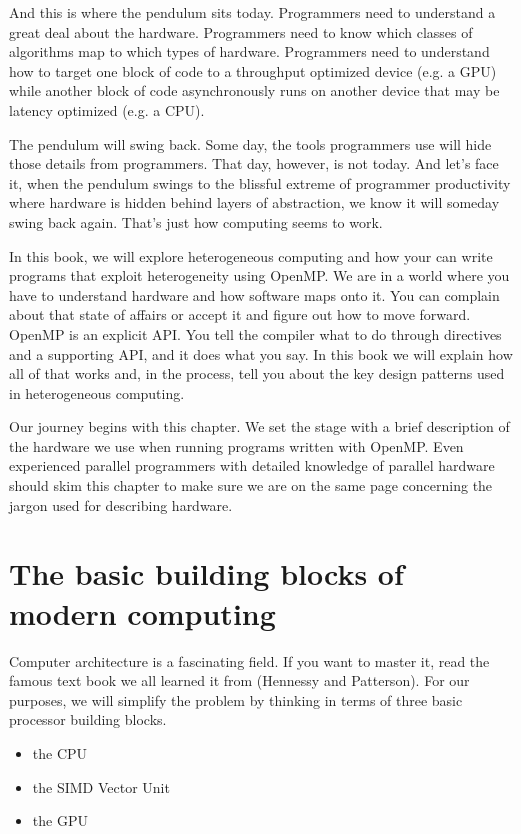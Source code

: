 And this is where the pendulum sits today.   Programmers need to understand a great deal about the hardware.  Programmers need to 
know which classes of algorithms map to which types of hardware.  Programmers need to understand how to target one block of 
code to a throughput optimized device (e.g. a GPU) while another block of code asynchronously runs on another device
that may be latency optimized (e.g. a CPU).  

The pendulum will swing back.  Some day, the tools programmers use will 
hide those details from programmers.   That day, however, is not today.   And let's face it, when the pendulum swings to the
blissful extreme of programmer productivity where hardware is hidden behind layers of abstraction, we know it will someday
swing back again.  That's just how computing seems to work.

In this book, we will explore heterogeneous computing and how your can write programs that exploit heterogeneity 
using OpenMP.  We are in a world where you have to understand hardware and how software maps onto it.   You can 
complain about that state of affairs or accept it and figure out how to move forward.  OpenMP is an explicit API.  You 
tell the compiler what to do through directives and a supporting API, and it does what you say.    In this book we will
explain how all of that works and, in the process, tell you about the key design patterns used in heterogeneous computing.

Our journey begins with this chapter.  We set the stage with a brief description of the hardware we use when
running programs written with OpenMP.   Even experienced parallel programmers with detailed knowledge of
parallel hardware should skim this chapter to make sure we are on the same page concerning the jargon used
for describing hardware.

\section{The basic building blocks of modern computing}

Computer architecture is a fascinating field. If you want to master it, read the
famous text book we all learned it from (Hennessy and Patterson).  For our purposes, 
we will simplify the problem by thinking in terms of three basic processor building blocks.

\begin{itemize}
\item  the CPU
\item  the SIMD Vector Unit
\item  the GPU
\end{itemize}

